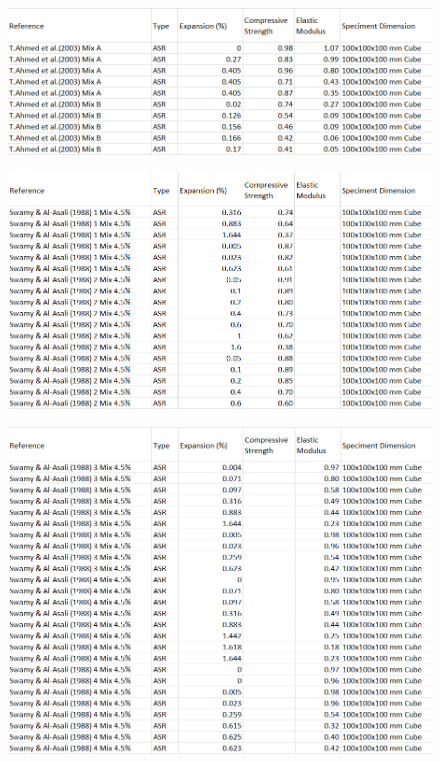 \begin{figure}[h!]
  \centering
  \includegraphics[width=1.0\linewidth]{Reference/AhmedASRdata.png}
\end{figure}

\begin{figure}[h!]
  \centering
  \includegraphics[width=1.0\linewidth]{Reference/SwamyASRdata_1.png}
\end{figure}

\begin{figure}[h!]
  \centering
  \includegraphics[width=1.0\linewidth]{Reference/SwamyASRdata_2.png}
\end{figure}


%
%
%
